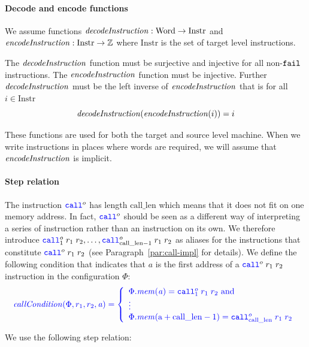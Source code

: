 \documentclass[a3paper]{article}
\newcommand{\fun}{\rightarrow}
\newcommand{\tand}{\text{ and }}
\newcommand{\sourcecolor}{\color{blue}}
\newcommand{\src}[1]{{\sourcecolor #1}}
\newcommand{\targetcolor}[1]{\color{black}}
\newcommand{\trg}[1]{{\targetcolor{} #1}}
\newcommand{\zinstr}[1]{\texttt{#1}}
\newcommand{\scall}[4][]{  
\ifthenelse{\equal{#3#4}{}}
  {\ensuremath{\zinstr{\src{call}}_{#1}^{#2}}}
  {\ensuremath{\zinstr{\src{call}}_{#1}^{#2} \; #3 \; #4}}
}
\newcommand{\tfail}{\zinstr{\trg{fail}}}
\newcommand{\ints}{\mathbb{Z}}
\newcommand{\shareddom}[1]{\mathrm{#1}}
\newcommand{\Word}{\shareddom{Word}}
\newcommand{\Instr}{\shareddom{Instr}}
\newcommand{\addr}{\shareddom{a}}
\newcommand{\var}[1]{\mathit{#1}}
\newcommand{\mem}{\var{mem}}
\newcommand{\aaddr}{\var{a}}
\newcommand{\constant}[1]{\mathrm{#1}}
\newcommand{\calllen}{\constant{call\_len}}
\newcommand{\plainfun}[2]{
  \ifthenelse{\equal{#2}{}}
  {\mathit{#1}}
  {\mathit{#1}(#2)}
}
\newcommand{\callCond}[1]{\plainfun{callCondition}{#1}}
\newcommand{\decInstr}[1]{\plainfun{decodeInstruction}{#1}}
\newcommand{\encInstr}[1]{\plainfun{encodeInstruction}{#1}}
\begin{document}
\paragraph{Decode and encode functions}
We assume functions $\decInstr{} : \Word \fun \Instr$ and $\encInstr{} : \Instr \fun \ints$ where $\Instr$ is the set of target level instructions.

The $\decInstr{}$ function must be surjective and injective for all non-$\tfail$ instructions. The $\encInstr{}$ function must be injective. Further $\decInstr{}$ must be the left inverse of $\encInstr{}$ that is for all $i \in \Instr$
\[
  \decInstr{}(\encInstr{i}) = i
\]

These functions are used for both the target and source level machine. When we write instructions in places where words are required, we will assume that $\encInstr{}$ is implicit.

\paragraph{Step relation}
The instruction $\scall{o}{}{}$ has length $\calllen$ which means that it does not fit on one memory address. In fact, $\scall{o}{}{}$ should be seen as a different way of interpreting a series of instruction rather than an instruction on its own. We therefore introduce $\scall[1]{o}{r_1}{r_2},\dots,\scall[\calllen-1]{o}{r_1}{r_2}$ as aliases for the instructions that constitute $\scall{o}{r_1}{r_2}$ (see Paragraph~\ref{par:call-impl} for details). We define the following condition that indicates that $\aaddr$ is the first address of a $\scall{o}{r_1}{r_2}$ instruction in the configuration $\Phi$:
\[
  \sourcecolor\left.
    \callCond{\Phi,r_1,r_2,\aaddr} = \left\{
      \begin{array}{l}
        \Phi.\mem(\aaddr) = \scall[1]{o}{r_1}{r_2} \tand\\
        \vdots \\
        \Phi.\mem(\addr+\calllen-1) = \scall[\calllen]{o}{r_1}{r_2}
      \end{array}
      \right.
  \right.
\]

We use the following step relation:
\end{document}
